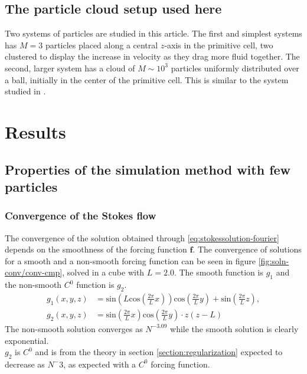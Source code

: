 \documentclass[a4paper,
twoside=false,abstract=false,numbers=noenddot,
titlepage=false,headings=small,parskip=half,version=last]{scrartcl}
\begin{document}
\subsection{The particle cloud setup used here}

Two systems of particles are studied in this article.
The first and simplest systems has $M=3$ particles placed along a central $z$-axis in the primitive cell, two clustered to display the increase in velocity as they drag more fluid together.
The second, larger system has a cloud of $M\sim 10^3$ particles uniformly distributed over a ball, initially in the center of the primitive cell. This is similar to the system studied in \cite{fallingclouds}.

\section{Results}

\subsection{Properties of the simulation method with few particles}

\subsubsection{Convergence of the Stokes flow}
The convergence of the solution obtained through \eqref{eq:stokessolution-fourier} depends on the smoothness of the forcing function $\mathbf{f}$.
The convergence of solutions for a smooth and a non-smooth forcing function can be seen in figure \ref{fig:soln-conv/conv-cmp}, solved in a cube with $L=2.0$.
The smooth function is $g_1$ and the non-smooth $C^0$ function is $g_2$.
\begin{align}
g_1(x,y,z) &= \text{sin}(L\text{cos}(\frac{2\pi}{L}x))\text{cos}(\frac{2\pi}{L}y) + \text{sin}(\frac{2\pi}{L}z),\nonumber\\
g_2(x,y,z) &= \text{sin}(\frac{2\pi}{L}x)\text{cos}(\frac{2\pi}{L}y)\cdot z(z-L)\nonumber%
\end{align}
The non-smooth solution converges as $N^{-3.09}$ while the smooth solution is clearly exponential.\\ %
$g_2$ is $C^0$ and is from the theory in section \ref{section:regularization} expected to decrease as $N^-3$, as expected with a $C^0$ forcing function.
\end{document}
